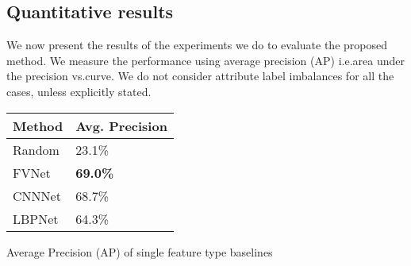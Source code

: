 \documentclass{sig-alternate-05-2015}
\begin{document}
\subsection{Quantitative results}
We now present the results of the experiments we do to evaluate the proposed method. We measure the performance using average precision (AP) i.e.\the area under the precision vs.\recall curve. 
We do not consider attribute label imbalances for all the cases, unless explicitly stated. 

\centering
{}
\begin{tabular}{|K|C| }
  \hline
  Method       & Avg. Precision\\
  \hline
  Random       & 23.1\%       		  \\
 
  FVNet     & \textbf{69.0\%}     \\
 
  CNNNet    &  68.7\%             \\
  
  LBPNet    & 64.3\%             \\
    
  \hline
\end{tabular}
\caption{Average Precision (AP) of single feature type baselines} 
\label{tab:perf_single_feat}
\end{document}
